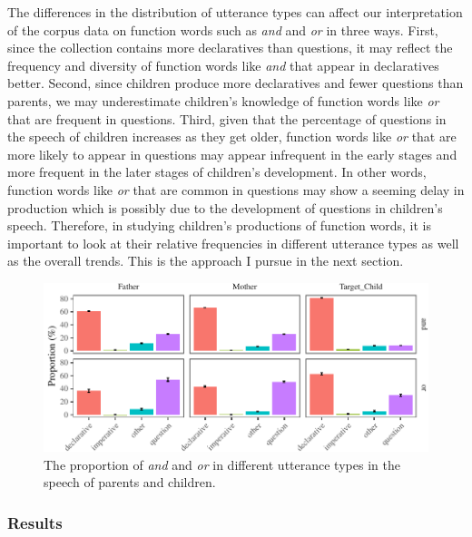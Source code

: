 \documentclass[floatsintext,man]{apa6}
\theoremstyle{definition}
\theoremstyle{definition}
\theoremstyle{definition}
\theoremstyle{remark}
\begin{document}
The differences in the distribution of utterance types can affect our
interpretation of the corpus data on function words such as \emph{and}
and \emph{or} in three ways. First, since the collection contains more
declaratives than questions, it may reflect the frequency and diversity
of function words like \emph{and} that appear in declaratives better.
Second, since children produce more declaratives and fewer questions
than parents, we may underestimate children's knowledge of function
words like \emph{or} that are frequent in questions. Third, given that
the percentage of questions in the speech of children increases as they
get older, function words like \emph{or} that are more likely to appear
in questions may appear infrequent in the early stages and more frequent
in the later stages of children's development. In other words, function
words like \emph{or} that are common in questions may show a seeming
delay in production which is possibly due to the development of
questions in children's speech. Therefore, in studying children's
productions of function words, it is important to look at their relative
frequencies in different utterance types as well as the overall trends.
This is the approach I pursue in the next section.

\begin{figure}[tb]

{\centering \includegraphics{figs/CnctPropbySpeechAct-1} 

}

\caption{The proportion of \textit{and} and \textit{or} in different utterance types in the speech of parents and children.}\label{fig:CnctPropbySpeechAct}
\end{figure}

\subsubsection{Results}\label{study1results}
\end{document}
